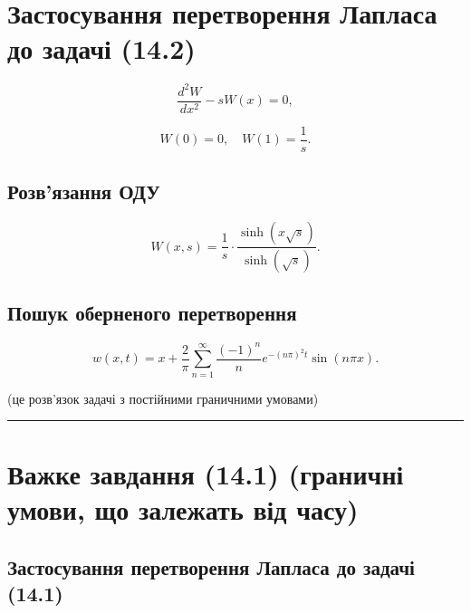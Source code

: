 \documentclass[
  ukrainian,
]{article}
\begin{document}
\section{Застосування перетворення Лапласа до задачі
(14.2)}\label{ux437ux430ux441ux442ux43eux441ux443ux432ux430ux43dux43dux44f-ux43fux435ux440ux435ux442ux432ux43eux440ux435ux43dux43dux44f-ux43bux430ux43fux43bux430ux441ux430-ux434ux43e-ux437ux430ux434ux430ux447ux456-14.2}

\[
\frac{d^2 W}{dx^2} - s W(x) = 0,
\]

\[
W(0) = 0, \quad W(1) = \frac{1}{s}.
\]

\subsection{Розв'язання
ОДУ}\label{ux440ux43eux437ux432ux44fux437ux430ux43dux43dux44f-ux43eux434ux443}

\[
W(x, s) = \frac{1}{s} \cdot \frac{\sinh(x \sqrt{s})}{\sinh(\sqrt{s})}.
\]

\subsection{Пошук оберненого
перетворення}\label{ux43fux43eux448ux443ux43a-ux43eux431ux435ux440ux43dux435ux43dux43eux433ux43e-ux43fux435ux440ux435ux442ux432ux43eux440ux435ux43dux43dux44f}

\[
w(x, t) = x + \frac{2}{\pi} \sum_{n=1}^{\infty} \frac{(-1)^n}{n} e^{-(n\pi)^2 t} \sin(n\pi x).
\]

(це розв'язок задачі з постійними граничними умовами)

\begin{center}\rule{0.5\linewidth}{0.5pt}\end{center}

\section{Важке завдання (14.1) (граничні умови, що залежать від
часу)}\label{ux432ux430ux436ux43aux435-ux437ux430ux432ux434ux430ux43dux43dux44f-14.1-ux433ux440ux430ux43dux438ux447ux43dux456-ux443ux43cux43eux432ux438-ux449ux43e-ux437ux430ux43bux435ux436ux430ux442ux44c-ux432ux456ux434-ux447ux430ux441ux443}

\subsection{Застосування перетворення Лапласа до задачі
(14.1)}\label{ux437ux430ux441ux442ux43eux441ux443ux432ux430ux43dux43dux44f-ux43fux435ux440ux435ux442ux432ux43eux440ux435ux43dux43dux44f-ux43bux430ux43fux43bux430ux441ux430-ux434ux43e-ux437ux430ux434ux430ux447ux456-14.1}
\end{document}
